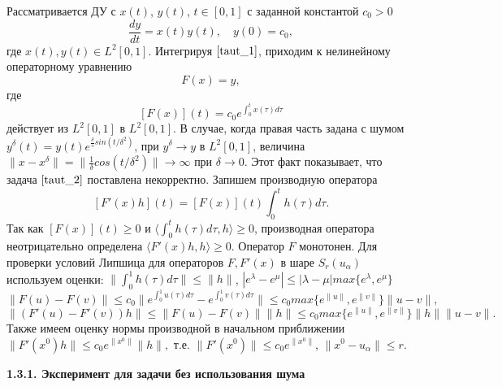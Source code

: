 Рассматривается ДУ с $x(t)$, $y(t)$, $t\in[0, 1]$ с заданной константой $c_0>0$
\begin{equation}\label{taut_1}
\frac{dy}{dt}=x(t)y(t), \quad y(0)=c_0,
\end{equation}
где $x(t), y(t)\in L^2[0,1]$. Интегрируя $\eqref{taut_1}$, приходим к нелинейному операторному уравнению
\begin{equation}\label{taut_2}
F(x)=y,
\end{equation}
где $$[F(x)](t)=c_0 e^{\int_{0}^{t}x(\tau)d\tau}$$
действует из $L^2[0,1]$ в $L^2[0,1]$. В случае, когда правая часть задана с шумом $y^\delta(t)=y(t)e^{\frac{\delta}{5} sin(t/{\delta}^2)}$, при $y^\delta\to y$ в $L^2[0,1]$, величина $\|x-x^\delta\|=\|\frac{1}{\delta}cos(t/{\delta}^2)\|\to\infty$ при $\delta\to 0$. Этот факт показывает, что задача $\eqref{taut_2}$ поставлена некорректно. Запишем производную оператора
\begin{equation}\label{taut_3}
[F'(x)h](t)=[F(x)](t)\int_{0}^{t}h(\tau)d\tau.
\end{equation}
Так как $[F(x)](t)\ge 0$ и $\langle\int_{0}^{t}h(\tau)d\tau, h\rangle\ge 0$, производная оператора неотрицательно определена $\langle F'(x)h, h\rangle\ge 0$. Оператор $F$ монотонен. Для проверки условий Липшица для операторов $F, F'(x)$ в шаре $S_r(u_\alpha)$ используем оценки: $\|\int_{0}^{1}h(\tau)d\tau\|\le\|h\|$, $|e^\lambda-e^\mu|\le|\lambda-\mu|max\{e^\lambda, e^\mu\}$
$$\|F(u)-F(v)\|\le c_0\|e^{\int_{0}^{1}u(\tau)d\tau}-e^{\int_{0}^{1}v(\tau)d\tau}\|
\le c_0 max\{e^{\|u\|},e^{\|v\|}\}\|u-v\|,$$
$$\|(F'(u)-F'(v))h\|\le\|F(u)-F(v)\|\|h\|\le c_0 max\{e^{\|u\|},e^{\|v\|}\}\|h\|\|u-v\|.$$
Также имеем оценку нормы производной в начальном приближении $\|F'(x^0)h\|\le c_0 e^{\|x^0\|}\|h\|,$ т.е. $\|F'(x^0)\|\le c_0 e^{\|x^0\|}$, $\|x^0-u_\alpha\|\le r$.

{\bfseries 1.3.1. Эксперимент для задачи без использования шума} 

